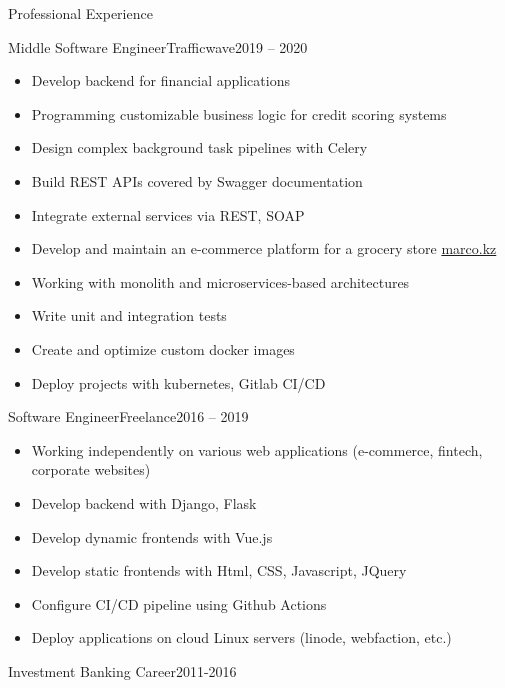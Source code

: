 \documentclass[]{mcdowellcv}
\begin{document}
\begin{cvsection}{Professional Experience}
  \begin{cvsubsection}{Middle Software Engineer}{Trafficwave}{2019 -- 2020}
    \begin{itemize}
      \item Develop backend for financial applications
      \item Programming customizable business logic for credit scoring systems
      \item Design complex background task pipelines with Celery
      \item Build REST APIs covered by Swagger documentation
      \item Integrate external services via REST, SOAP
      \item Develop and maintain an e-commerce platform for a grocery store \href{https://marco.kz/}{marco.kz}
      \item Working with monolith and microservices-based architectures
      \item Write unit and integration tests
      \item Create and optimize custom docker images
      \item Deploy projects with kubernetes, Gitlab CI/CD
    \end{itemize}
  \end{cvsubsection}

  \begin{cvsubsection}{Software Engineer}{Freelance}{2016 -- 2019}
    \begin{itemize}
      \item Working independently on various web applications (e-commerce, fintech, corporate websites)
      \item Develop backend with Django, Flask
      \item Develop dynamic frontends with Vue.js
      \item Develop static frontends with Html, CSS, Javascript, JQuery
      \item Configure CI/CD pipeline using Github Actions
      \item Deploy applications on cloud Linux servers (linode, webfaction, etc.)
    \end{itemize}
  \end{cvsubsection}

  \begin{cvsubsection}{Investment Banking Career}{}{2011-2016}
  \end{cvsubsection}

\end{cvsection}
\end{document}
